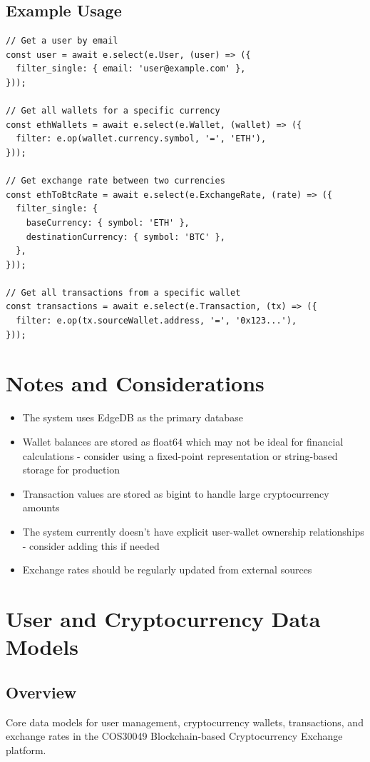\subsection{Example Usage}
\begin{tcolorbox}[width=\textwidth, boxrule=0.5pt, colback=gray!5, colframe=gray!50]
\begin{verbatim}
// Get a user by email
const user = await e.select(e.User, (user) => ({
  filter_single: { email: 'user@example.com' },
}));

// Get all wallets for a specific currency
const ethWallets = await e.select(e.Wallet, (wallet) => ({
  filter: e.op(wallet.currency.symbol, '=', 'ETH'),
}));

// Get exchange rate between two currencies
const ethToBtcRate = await e.select(e.ExchangeRate, (rate) => ({
  filter_single: {
    baseCurrency: { symbol: 'ETH' },
    destinationCurrency: { symbol: 'BTC' },
  },
}));

// Get all transactions from a specific wallet
const transactions = await e.select(e.Transaction, (tx) => ({
  filter: e.op(tx.sourceWallet.address, '=', '0x123...'),
}));
\end{verbatim}
\end{tcolorbox}
\section*{Notes and Considerations}

\begin{itemize}
  \item The system uses EdgeDB as the primary database
  \item Wallet balances are stored as float64 which may not be ideal for financial calculations - consider using a fixed-point representation or string-based storage for production
  \item Transaction values are stored as bigint to handle large cryptocurrency amounts
  \item The system currently doesn't have explicit user-wallet ownership relationships - consider adding this if needed
  \item Exchange rates should be regularly updated from external sources
\end{itemize}
\section{User and Cryptocurrency Data Models}
\subsection{Overview}
Core data models for user management, cryptocurrency wallets, transactions, and exchange rates in the COS30049 Blockchain-based Cryptocurrency Exchange platform.
